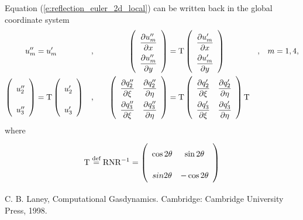 \documentclass[a4paper,12pt,dvips]{article}
\newcommand*\defeq{\buildrel{\text{def}}\over{=}}
\begin{document}
Equation (\ref{e:reflection_euler_2d_local}) can be written back in the global
coordinate system
\begin{alignat}{4}
\renewcommand{\arraystretch}{2.2}
\begin{aligned}
  u''_m &= u'_m&,& \quad
  &\left(\begin{array}{c}
    \dfrac{\partial u''_m}{\partial x} \\
    \dfrac{\partial u''_m}{\partial y}
  \end{array}\right)
  &= \mathrm{T} \left(\begin{array}{c}
    \dfrac{\partial u'_m}{\partial x} \\
    \dfrac{\partial u'_m}{\partial y}
  \end{array}\right)&,& \quad m = 1, 4, \\
  \left(\begin{array}{c}
    u''_2 \\ u''_3
  \end{array}\right)
  &= \mathrm{T} \left(\begin{array}{c}
    u'_2 \\ u'_3
  \end{array}\right)&,& \quad
  &\left(\begin{array}{cc}
    \dfrac{\partial q''_2}{\partial\xi} &
    \dfrac{\partial q''_2}{\partial\eta} \\
    \dfrac{\partial q''_3}{\partial\xi} &
    \dfrac{\partial q''_3}{\partial\eta}
  \end{array}\right)
  &= \mathrm{T} \left(\begin{array}{cc}
    \dfrac{\partial q'_2}{\partial\xi} &
    \dfrac{\partial q'_2}{\partial\eta} \\
    \dfrac{\partial q'_3}{\partial\xi} &
    \dfrac{\partial q'_3}{\partial\eta}
  \end{array}\right) \mathrm{T}&&
\end{aligned} \label{e:reflection_euler_2d_global}
\end{alignat}
where
\begin{align}
  \mathrm{T} \defeq \mathrm{R}\mathrm{N}\mathrm{R}^{-1}
  = \left(\begin{array}{cc}
    \cos2\theta & \sin2\theta \\ sin2\theta & -\cos2\theta
  \end{array}\right) \label{e:reflection_T}
\end{align}

\begin{thebibliography}{99}
 C. B. Laney, Computational Gasdynamics.
Cambridge: Cambridge University Press, 1998.
\end{thebibliography}
\end{document}
